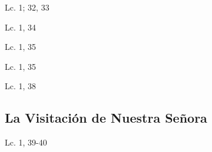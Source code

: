 \documentclass[a4paper,11pt,sans]{article}
\begin{document}
      \begin{multicols}{2}

      \columnbreak
          
      \end{multicols}
      \begin{center}
        Lc. 1; 32, 33        
      \end{center}
      
      \begin{multicols}{2}

      \columnbreak
          
      \end{multicols}
      \begin{center}
        Lc. 1, 34         
      \end{center}
      
      \begin{multicols}{2}

      \columnbreak
          
      \end{multicols}
      \begin{center}
        Lc. 1, 35       
      \end{center}
      
      \begin{multicols}{2}

      \columnbreak
          
      \end{multicols}
      \begin{center}
        Lc. 1, 35      
      \end{center}      
      
      \begin{multicols}{2}

      \columnbreak
          
      \end{multicols}
      \begin{center}
        Lc. 1, 38      
      \end{center}
            
    \subsection*{\hfil La Visitación de Nuestra Señora \hfil}
      
      \begin{multicols}{2}

      \columnbreak
          
      \end{multicols}
      \begin{center}
        Lc. 1, 39-40        
      \end{center}
      
\end{document}
